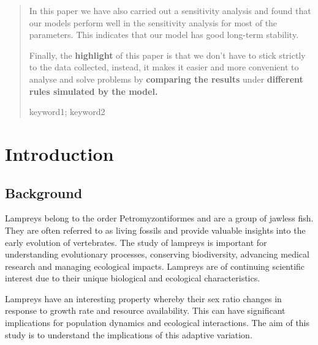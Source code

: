 \documentclass{mcmthesis}
\begin{document}
\begin{abstract}
In this paper we have also carried out a sensitivity analysis and found that our models perform well in the sensitivity analysis for most of the parameters. This indicates that our model has good long-term stability.

Finally, the \textbf{highlight} of this paper is that we don't have to stick strictly to the data collected, instead, it makes it easier and more convenient to analyse and solve problems by \textbf{comparing the results} under \textbf{different rules simulated by the model.}

\begin{keywords}
keyword1; keyword2
\end{keywords}
\end{abstract}
\maketitle

\tableofcontents

\newpage
\section{Introduction}  %
\subsection{Background}

Lampreys belong to the order Petromyzontiformes and are a group of jawless fish. They are often referred to as living fossils and provide valuable insights into the early evolution of vertebrates. The study of lampreys is important for understanding evolutionary processes, conserving biodiversity, advancing medical research and managing ecological impacts. Lampreys are of continuing scientific interest due to their unique biological and ecological characteristics. 

Lampreys have an interesting property whereby their sex ratio changes in response to growth rate and resource availability. This can have significant implications for population dynamics and ecological interactions. The aim of this study is to understand the implications of this adaptive variation. 
\end{document}
